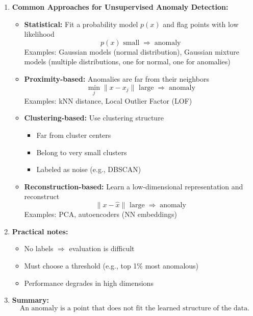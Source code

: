 \documentclass{article}
\begin{document}
\begin{enumerate}
\begin{itemize}
    \item \textbf{Unsupervised:} 
    \begin{itemize}
        \item No labels available
        \item Detect outliers using distance, density, clustering, or reconstruction
        \item Example: network intrusion detection without prior labels
    \end{itemize}
\end{itemize}

\item \textbf{Common Approaches for Unsupervised Anomaly Detection:}
\begin{itemize}
\item \textbf{Statistical:} Fit a probability model \(p(x)\) and flag points with low likelihood
\[
p(x) \text{ small} \;\Rightarrow\; \text{anomaly}
\]
Examples: Gaussian models (normal distribution), Gaussian mixture models (multiple distributions, one for normal, one for anomalies)

\item \textbf{Proximity-based:} Anomalies are far from their neighbors
\[
\min_j \|x - x_j\| \text{ large} \;\Rightarrow\; \text{anomaly}
\]
Examples: kNN distance, Local Outlier Factor (LOF)

\item \textbf{Clustering-based:} Use clustering structure
\begin{itemize}
\item Far from cluster centers
\item Belong to very small clusters
\item Labeled as noise (e.g., DBSCAN)
\end{itemize}

\item \textbf{Reconstruction-based:} Learn a low-dimensional representation and reconstruct
\[
\|x - \hat{x}\| \text{ large} \;\Rightarrow\; \text{anomaly}
\]
Examples: PCA, autoencoders (NN embeddings)
\end{itemize}

\item \textbf{Practical notes:}
\begin{itemize}
\item No labels $\Rightarrow$ evaluation is difficult
\item Must choose a threshold (e.g., top 1\% most anomalous)
\item Performance degrades in high dimensions
\end{itemize}

\item \textbf{Summary:}
\[
\text{An anomaly is a point that does not fit the learned structure of the data.}
\]

\end{enumerate}
\end{document}
